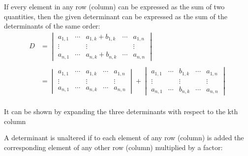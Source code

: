 \documentclass{article}
\begin{document}
	\begin{thm}[]	
	 If every element in any row (column) can be	expressed as the sum of two quantities, then the given determinant can be expressed as the sum of the determinants of the same order:\\	
	\begin{align*}
	D &= \begin{vmatrix}
	a_{1,1}&\cdots &a_{1,k}+b_{1,k}& \cdots& a_{1,n}      \\
	\vdots & & \vdots & &\vdots \\ 
	a_{n,1}  & \cdots & a_{n,k}+b_{n,k} & \cdots& a_{n,n}
	\end{vmatrix}	\\ \\
	&= \begin{vmatrix}
	a_{1,1}      & \cdots & a_{1,k}  & \cdots& a_{1,n}      \\
	\vdots & & \vdots & &\vdots \\ 
	a_{n,1}  & \cdots & a_{n,k} & \cdots& a_{n,n}
	\end{vmatrix} 
	 + \begin{vmatrix}
	a_{1,1}      & \cdots & b_{1,k}  & \cdots& a_{1,n}      \\
	\vdots & & \vdots & &\vdots \\ 
	a_{n,1}  & \cdots & b_{n,k} & \cdots& a_{n,n}
	\end{vmatrix}	\\ 
	\end{align*}
\end{thm}
It can be shown by expanding the three determinants with respect to the kth column \\
	
	

	\begin{cor}
	A determinant is unaltered if to each element of any row (column) is added the corresponding element of any other row (column) multiplied by a factor:

	\end{cor}
\end{document}
